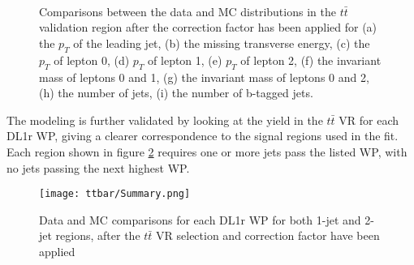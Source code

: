 \begin{figure}[H]
    \centering
    \\                                     
    \\                                        
    \\                             
    \caption{Comparisons between the data and MC distributions in the $t\bar{t}$ validation region after the correction factor has been applied for (a) the $p_T$ of the leading jet, (b) the missing transverse energy, (c) the $p_T$ of lepton 0, (d) $p_T$ of lepton 1, (e) $p_T$ of lepton 2, (f) the invariant mass of leptons 0 and 1, (g) the invariant mass of leptons 0 and 2, (h) the number of jets, (i) the number of b-tagged jets.}                                                                   
     \label{fig:ttbar_withScale}
\end{figure}

The modeling is further validated by looking at the yield in the $t\bar{t}$ VR for each DL1r WP, giving a clearer correspondence to the signal regions used in the fit. Each region shown in figure \ref{fig:ttbar_summary} requires one or more jets pass the listed WP, with no jets passing the next highest WP.

\begin{figure}[H]
   \centering
   \texttt{[image: ttbar/Summary.png]}   
   \caption{Data and MC comparisons for each DL1r WP for both 1-jet and 2-jet regions, after the $t\bar{t}$ VR selection and correction factor have been applied}
   \label{fig:ttbar_summary}
\end{figure}

